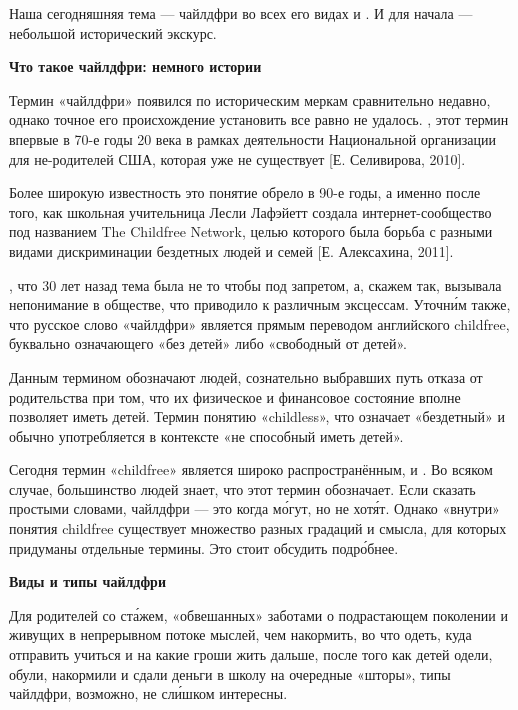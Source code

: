 Наша сегодняшняя тема --- чайлдфри во всех его видах и . И для начала --- небольшой исторический экскурс.

\textbf{Что такое чайлдфри: немного истории}

Термин «чайлдфри» появился по историческим меркам сравнительно недавно, однако точное его происхождение установить все равно не удалось. , этот термин впервые  в 70-е годы 20 века в рамках деятельности Национальной организации для не-родителей США, которая  уже не существует [Е. Селивирова, 2010].

Более широкую известность это понятие обрело в 90-е годы, а именно после того, как школьная учительница Лесли Лафэйетт создала интернет-сообщество под названием The Childfree Network, целью которого была борьба с разными видами дискриминации бездетных людей и семей [Е. Алексахина, 2011].

, что 30 лет назад тема была не то чтобы под запретом, а, скажем так, вызывала непонимание в обществе, что приводило к различным эксцессам. Уточн\'{и}м также, что русское слово «чайлдфри» является прямым переводом английского childfree, буквально означающего «без детей» либо «свободный от детей».

Данным термином обозначают людей, сознательно выбравших путь отказа от родительства при том, что их физическое и финансовое состояние вполне позволяет иметь детей. Термин   понятию «childless», что означает «бездетный» и обычно употребляется в контексте «не способный иметь детей».

Сегодня термин «childfree» является широко распространённым,  и . Во всяком случае, большинство людей знает, что этот термин обозначает. Если сказать простыми словами, чайлдфри --- это когда м\'{о}гут, но не хот\'{я}т. Однако «внутри» понятия childfree существует множество разных градаций и  смысла, для которых придуманы отдельные термины. Это стоит обсудить подр\'{о}бнее.

\textbf{Виды и типы чайлдфри}

Для родителей со ст\'{а}жем, «обвешанных» заботами о подрастающем поколении и живущих в непрерывном потоке мыслей, чем накормить, во что одеть, куда отправить учиться и на какие гроши жить дальше, после того как детей одели, обули, накормили и сдали деньги в школу на очередные «шторы», типы чайлдфри, возможно, не сл\'{и}шком интересны.

